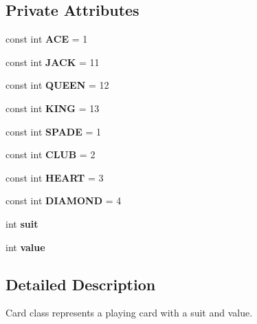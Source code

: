 \subsection*{Private Attributes}
\begin{DoxyCompactItemize}
\item 
\mbox{\label{classcard_aa10e2884f273f75aa313a8bb5a6251f3}} 
const int {\bfseries A\+CE} = 1
\item 
\mbox{\label{classcard_a6b40b986e5bf417dc80ac4b6ef90d1a1}} 
const int {\bfseries J\+A\+CK} = 11
\item 
\mbox{\label{classcard_aa09c255786e6ee4d89f731aa500fd07a}} 
const int {\bfseries Q\+U\+E\+EN} = 12
\item 
\mbox{\label{classcard_a3dc8786d461be27ba29989676cdd4e44}} 
const int {\bfseries K\+I\+NG} = 13
\item 
\mbox{\label{classcard_acfc456145e637a32f29657fb25964f30}} 
const int {\bfseries S\+P\+A\+DE} = 1
\item 
\mbox{\label{classcard_ac2613bacd68296da2362a74fd3972c8c}} 
const int {\bfseries C\+L\+UB} = 2
\item 
\mbox{\label{classcard_ad702ec3223c4b79a958a6ebd56887a32}} 
const int {\bfseries H\+E\+A\+RT} = 3
\item 
\mbox{\label{classcard_a7a30e10aeb7f2f1d6c766dd37aa8ac16}} 
const int {\bfseries D\+I\+A\+M\+O\+ND} = 4
\item 
\mbox{\label{classcard_a173236802fa7d0c52e411523ae9d30fa}} 
int {\bfseries suit}
\item 
\mbox{\label{classcard_a8c8ecc859e715ee6b55bef5d692f508b}} 
int {\bfseries value}
\end{DoxyCompactItemize}


\subsection{Detailed Description}
Card class represents a playing card with a suit and value. 


